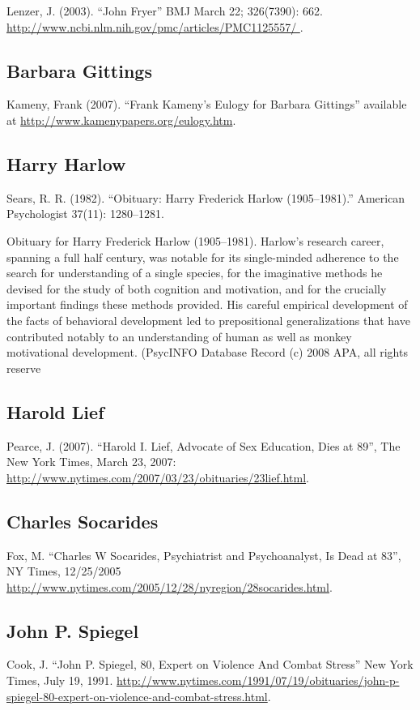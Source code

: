 \begin{refsection}
\begin{appendices}
Lenzer, J. (2003). “John Fryer” BMJ March 22; 326(7390): 662. \url{http://www.ncbi.nlm.nih.gov/pmc/articles/PMC1125557/ }.

\subsection{Barbara Gittings}
\label{barbaragittings}

Kameny, Frank (2007). “Frank Kameny's Eulogy for Barbara Gittings” available at \url{http://www.kamenypapers.org/eulogy.htm}.

\subsection{Harry Harlow}
\label{harryharlow}

Sears, R. R. (1982). ``Obituary: Harry Frederick Harlow (1905--1981).'' American Psychologist 37(11): 1280--1281. 

Obituary for Harry Frederick Harlow (1905--1981). Harlow's research career, spanning a full half century, was notable for its single-minded adherence to the search for understanding of a single species, for the imaginative methods he devised for the study of both cognition and motivation, and for the crucially important findings these methods provided. His careful empirical development of the facts of behavioral development led to prepositional generalizations that have contributed notably to an understanding of human as well as monkey motivational development. (PsycINFO Database Record (c) 2008 APA, all rights reserve 

\subsection{Harold Lief}
\label{haroldlief}

Pearce, J. (2007). “Harold I. Lief, Advocate of Sex Education, Dies at 89”, The New York Times, March 23, 2007: \url{http://www.nytimes.com/2007/03/23/obituaries/23lief.html}. 

\subsection{Charles Socarides}
\label{charlessocarides}

Fox, M. “Charles W Socarides, Psychiatrist and Psychoanalyst, Is Dead at 83”, NY Times, 12\slash 25\slash 2005 \url{http://www.nytimes.com/2005/12/28/nyregion/28socarides.html}.

\subsection{John P. Spiegel}
\label{johnp.spiegel}

Cook, J. “John P. Spiegel, 80, Expert on Violence And Combat Stress” New York Times, July 19, 1991. \url{http://www.nytimes.com/1991/07/19/obituaries/john-p-spiegel-80-expert-on-violence-and-combat-stress.html}.

\end{appendices}


\end{refsection}
